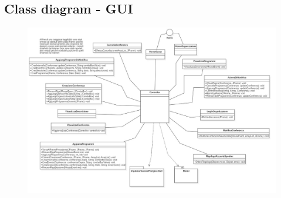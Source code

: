 \documentclass[a4paper,italian,10pt,openany]{book}
\begin{document}
\subsection{Class diagram - GUI}
\vspace{4cm}
\begin{figure}[h!]
\centering
\includegraphics[width=18cm]{ClassDiagram GUI}
\end{figure}
\newpage
\end{document}
